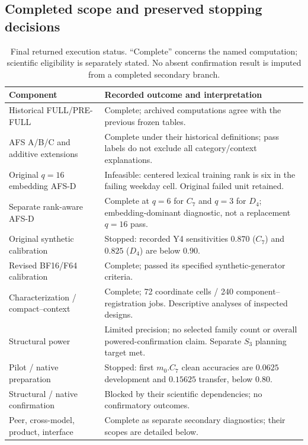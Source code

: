 \subsection{Completed scope and preserved stopping decisions}
\begin{table}[t]\centering\small
\caption{Final returned execution status. ``Complete'' concerns the named computation; scientific eligibility is separately stated. No absent confirmation result is imputed from a completed secondary branch.}
\label{tab:reproduction-status}
\begin{tabular}{p{}p{}}\toprule
Component & Recorded outcome and interpretation \\\midrule
Historical FULL/PRE-FULL & Complete; archived computations agree with the previous frozen tables. \\
AFS A/B/C and additive extensions & Complete under their historical definitions; pass labels do not exclude all category/context explanations. \\
Original $q=16$ embedding AFS-D & Infeasible: centered lexical training rank is six in the failing weekday cell. Original failed unit retained. \\
Separate rank-aware AFS-D & Complete at $q=6$ for $C_7$ and $q=3$ for $D_4$; embedding-dominant diagnostic, not a replacement $q=16$ pass. \\
Original synthetic calibration & Stopped: recorded Y4 sensitivities $0.870$ ($C_7$) and $0.825$ ($D_4$) are below $0.90$. \\
Revised BF16/F64 calibration & Complete; passed its specified synthetic-generator criteria. \\
Characterization / compact--context & Complete; 72 coordinate cells / 240 component--registration jobs. Descriptive analyses of inspected designs. \\
Structural power & Limited precision; no selected family count or overall powered-confirmation claim. Separate $S_3$ planning target met. \\
Pilot / native preparation & Stopped: first $m_0.C_7$ clean accuracies are $0.0625$ development and $0.15625$ transfer, below $0.80$. \\
Structural / native confirmation & Blocked by their scientific dependencies; no confirmatory outcomes. \\
Peer, cross-model, product, interface & Complete as separate secondary diagnostics; their scopes are detailed below. \\
\bottomrule\end{tabular}
\end{table}

